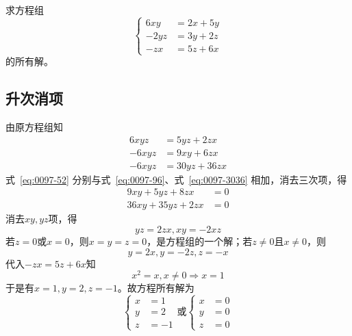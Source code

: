 

求方程组
\[ \left\{\begin{aligned}
  6xy &= 2x + 5y \\
  -2yz &= 3y + 2z \\
  -zx &= 5z + 6x
\end{aligned}\right. \]
的所有解。


\subsection{升次消项}

由原方程组知
\begin{align}
  6xyz &= 5yz + 2zx \label{eq:0097-52} \\
  -6xyz &= 9xy + 6zx \label{eq:0097-96} \\
  -6xyz &= 30yz + 36zx \label{eq:0097-3036}
\end{align}
式~\ref{eq:0097-52} 分别与式~\ref{eq:0097-96}、式~\ref{eq:0097-3036} 相加，消去三次项，得
\begin{align*}
  9xy + 5yz + 8zx &= 0 \\
  36xy + 35yz + 2zx &= 0
\end{align*}
消去$xy, yz$项，得
\[ yz = 2zx, xy = -2xz \]
若$z = 0$或$x = 0$，则$x = y = z = 0$，是方程组的一个解；若$z \ne 0$且$x \ne 0$，则
\[ y = 2x, y = -2z, z = -x \]
代入$-zx = 5z + 6x$知
\[ x^2 = x, x \ne 0 \Rightarrow x = 1 \]
于是有$x = 1, y = 2, z = -1$。故方程所有解为
\[ \left\{ \begin{aligned}
  x &= 1 \\ y &= 2 \\ z &= -1
\end{aligned} \right. \text{或} \left\{ \begin{aligned}
  x &= 0 \\ y &= 0 \\ z &= 0
\end{aligned} \right. \]

